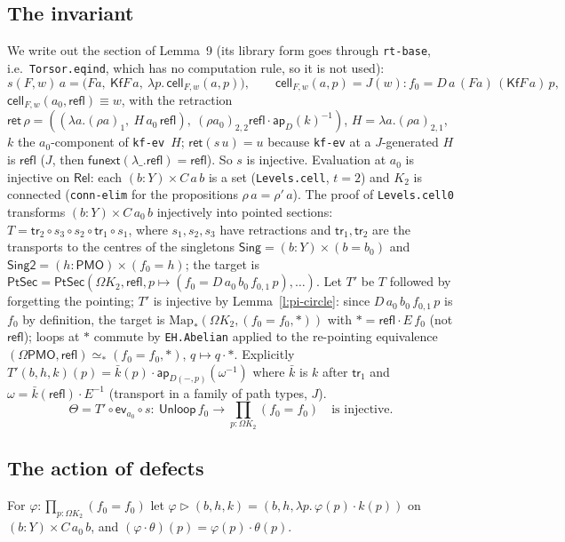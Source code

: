\documentclass[11pt]{amsart}
\theoremstyle{definition}
\theoremstyle{remark}
\newcommand{\Om}{\Omega}
\newcommand{\Map}{\mathrm{Map}_*}
\newcommand{\code}[1]{\texttt{#1}}
\newcommand{\refl}{\mathsf{refl}}
\newcommand{\Kf}{\mathsf{Kf}}
\newcommand{\Unl}{\mathsf{Unloop}}
\newcommand{\PMO}{\mathsf{PMO}}
\begin{document}
\subsection*{The invariant}
We write out the section of Lemma~9 (its library form goes through
\code{rt-base}, i.e.\ \code{Torsor.eqind}, which has no computation rule,
so it is not used):
\[s(F,w)\,a=\bigl(F a,\ \Kf F\,a,\ \lambda p.\,\mathsf{cell}_{F,w}(a,p)\bigr),\qquad
\mathsf{cell}_{F,w}(a,p)=J(w):f_0=D\,a\,(Fa)\,(\Kf F\,a)\,p,\]
$\mathsf{cell}_{F,w}(a_0,\refl)\equiv w$, with the retraction
$\mathsf{ret}\,\rho=((\lambda a.(\rho a)_1,\ H\,a_0\,\refl),\ (\rho a_0)_{2,2}\refl\cdot\mathsf{ap}_D(k)^{-1})$,
$H=\lambda a.(\rho a)_{2,1}$, $k$ the $a_0$-component of \code{kf-ev}~$H$;
$\mathsf{ret}(s\,u)=u$ because \code{kf-ev} at a $J$-generated $H$ is $\refl$
($J$, then $\mathsf{funext}(\lambda\_.\refl)=\refl$). So $s$ is injective. Evaluation at $a_0$ is injective on
$\mathsf{Rel}$: each $(b:Y)\times C\,a\,b$ is a set (\code{Levels.cell},
$t=2$) and $K_2$ is connected (\code{conn-elim} for the propositions
$\rho\,a=\rho'\,a$). The proof of \code{Levels.cell0} transforms
$(b:Y)\times C\,a_0\,b$ injectively into pointed sections:
$T=\mathsf{tr}_2\circ s_3\circ s_2\circ\mathsf{tr}_1\circ s_1$, where
$s_1,s_2,s_3$ have retractions and $\mathsf{tr}_1,\mathsf{tr}_2$ are the
transports to the centres of the singletons $\mathsf{Sing}=(b:Y)\times(b=b_0)$
and $\mathsf{Sing2}=(h:\PMO)\times(f_0=h)$; the target is
$\mathsf{PtSec}=\mathsf{PtSec}(\Om K_2,\refl,p\mapsto (f_0=D\,a_0\,b_0\,f_{0,1}\,p),\ldots)$.
Let $T'$ be $T$ followed by forgetting the pointing; $T'$ is injective by
Lemma~\ref{l:pi-circle}: since $D\,a_0\,b_0\,f_{0,1}\,p$ is $f_0$ by
definition, the target is $\Map(\Om K_2,(f_0=f_0,\ast))$ with
$\ast=\refl\cdot E\,f_0$ (not $\refl$); loops at $\ast$ commute by
\code{EH.Abelian} applied to the re-pointing equivalence
$(\Om\PMO,\refl)\simeq_*(f_0=f_0,\ast)$, $q\mapsto q\cdot\ast$.
Explicitly $T'(b,h,k)(p)=\bar k(p)\cdot\mathsf{ap}_{D(-,p)}(\omega^{-1})$
where $\bar k$ is $k$ after $\mathsf{tr}_1$ and
$\omega=\bar k(\refl)\cdot E^{-1}$ (transport in a family of path types,
$J$).
\[\Theta=T'\circ\mathsf{ev}_{a_0}\circ s:\ \Unl\,f_0\to\textstyle\prod_{p:\Om K_2}(f_0=f_0)\quad\text{is injective.}\]

\subsection*{The action of defects}
For $\varphi:\prod_{p:\Om K_2}(f_0=f_0)$ let
$\varphi\rhd(b,h,k)=(b,h,\lambda p.\,\varphi(p)\cdot k(p))$ on
$(b:Y)\times C\,a_0\,b$, and $(\varphi\cdot\theta)(p)=\varphi(p)\cdot\theta(p)$.
\end{document}
